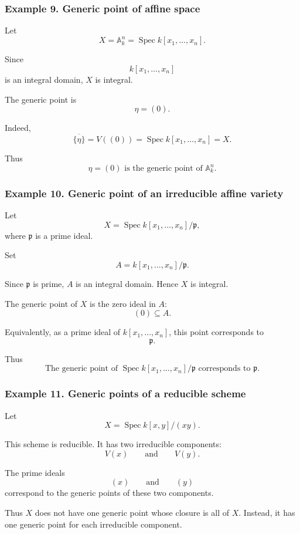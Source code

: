 \documentclass[12pt,a4paper]{article}
\theoremstyle{notespace}
\begin{document}
\subsubsection*{Example 9. Generic point of affine space}

Let
\[
X=\mathbb{A}^n_k=\operatorname{Spec}k[x_1,\dots,x_n].
\]

Since
\[
k[x_1,\dots,x_n]
\]
is an integral domain, \(X\) is integral.

The generic point is
\[
\eta=(0).
\]

Indeed,
\[
\overline{\{\eta\}}
=
V((0))
=
\operatorname{Spec}k[x_1,\dots,x_n]
=
X.
\]

Thus
\[
\boxed{
	\eta=(0)
	\text{ is the generic point of } \mathbb{A}^n_k.
}
\]

\subsubsection*{Example 10. Generic point of an irreducible affine variety}

Let
\[
X=\operatorname{Spec}k[x_1,\dots,x_n]/\mathfrak{p},
\]
where \(\mathfrak{p}\) is a prime ideal.

Set
\[
A=k[x_1,\dots,x_n]/\mathfrak{p}.
\]

Since \(\mathfrak{p}\) is prime, \(A\) is an integral domain. Hence \(X\) is integral.

The generic point of \(X\) is the zero ideal in \(A\):
\[
(0)\subseteq A.
\]

Equivalently, as a prime ideal of \(k[x_1,\dots,x_n]\), this point corresponds to
\[
\mathfrak{p}.
\]

Thus
\[
\boxed{
	\text{The generic point of } \operatorname{Spec}k[x_1,\dots,x_n]/\mathfrak{p}
	\text{ corresponds to } \mathfrak{p}.
}
\]

\subsubsection*{Example 11. Generic points of a reducible scheme}

Let
\[
X=\operatorname{Spec}k[x,y]/(xy).
\]

This scheme is reducible. It has two irreducible components:
\[
V(x)
\qquad\text{and}\qquad
V(y).
\]

The prime ideals
\[
(x)
\qquad\text{and}\qquad
(y)
\]
correspond to the generic points of these two components.

Thus \(X\) does not have one generic point whose closure is all of \(X\). Instead, it has one generic point for each irreducible component.
\end{document}
